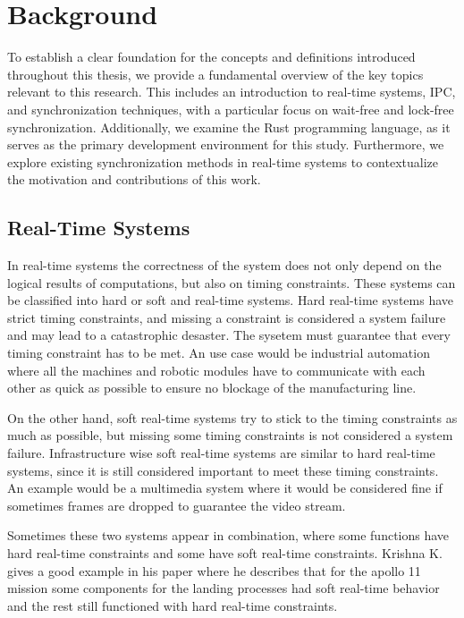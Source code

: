 \chapter{Background}\label{ch:background}

To establish a clear foundation for the concepts and definitions introduced throughout this thesis, we provide a fundamental overview of the key topics relevant to this research. This includes an introduction to real-time systems, \acf{IPC}, and synchronization techniques, with a particular focus on wait-free and lock-free synchronization. Additionally, we examine the Rust programming language, as it serves as the primary development environment for this study. Furthermore, we explore existing synchronization methods in real-time systems to contextualize the motivation and contributions of this work.

\section{Real-Time Systems}\label{sec:real-time}

In real-time systems the correctness of the system does not only depend on the logical results of computations, but also on timing constraints. These systems can be classified into hard or soft and real-time systems. Hard real-time systems have strict timing constraints, and missing a constraint is considered a system failure and may lead to a catastrophic desaster. The sysetem must guarantee that every timing constraint has to be met. An use case would be industrial automation where all the machines and robotic modules have to communicate with each other as quick as possible to ensure no blockage of the manufacturing line. \cite{HardSoftRealTime}

On the other hand, soft real-time systems try to stick to the timing constraints as much as possible, but missing some timing constraints is not considered a system failure. Infrastructure wise soft real-time systems are similar to hard real-time systems, since it is still considered important to meet these timing constraints. An example would be a multimedia system where it would be considered fine if sometimes frames are dropped to guarantee the video stream. \cite{HardSoftRealTime}

Sometimes these two systems appear in combination, where some functions have hard real-time constraints and some have soft real-time constraints. Krishna K. gives a good example in his paper where he describes that for the apollo 11 mission some components for the landing processes had soft real-time behavior and the rest still functioned with hard real-time constraints. \cite{HardSoftRealTime}

